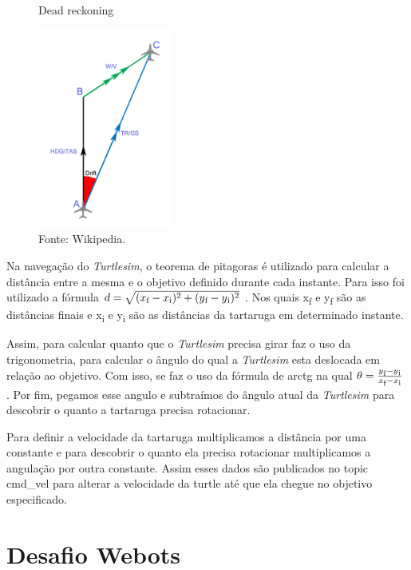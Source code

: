 
\begin{figure}[h!]
    \centering
    \caption{Dead reckoning}
    \includegraphics[width=0.4\textwidth]{Figures/dead_reck.png}
    \caption*{Fonte: Wikipedia.}
    \label{fig:Dead reckoning}
\end{figure}

Na navegação do \textit{Turtlesim}, o teorema de pitagoras é utilizado para calcular
a distância entre a mesma e o objetivo definido durante cada instante. Para isso foi utilizado a fórmula 
    $d = \sqrt{(x\textsubscript{f} - x\textsubscript{i})^2 + (y\textsubscript{f} - y\textsubscript{i})^2}$
. Nos quais x\textsubscript{f} e y\textsubscript{f} são as distâncias finais e x\textsubscript{i} e y\textsubscript{i} são as distâncias da tartaruga em determinado instante.

Assim, para calcular quanto que o \textit{Turtlesim} precisa girar faz o uso da trigonometria, para calcular o ângulo do qual a \textit{Turtlesim} esta deslocada  em relação ao objetivo. Com isso, se faz o uso da fórmula de arctg na qual 
$\theta = \frac{y\textsubscript{f} - y\textsubscript{i}}{x\textsubscript{f} - x\textsubscript{i}} $
. Por fim, pegamos esse angulo e subtraímos do ângulo atual da \textit{Turtlesim} para descobrir o quanto a tartaruga precisa rotacionar.

Para definir a velocidade da tartaruga multiplicamos a distância por uma constante e para descobrir o quanto ela precisa rotacionar multiplicamos a 
angulação por outra constante. Assim esses dados são publicados no topic
cmd\_vel para alterar a velocidade da turtle até que ela chegue no objetivo
especificado.

\section{Desafio Webots}

